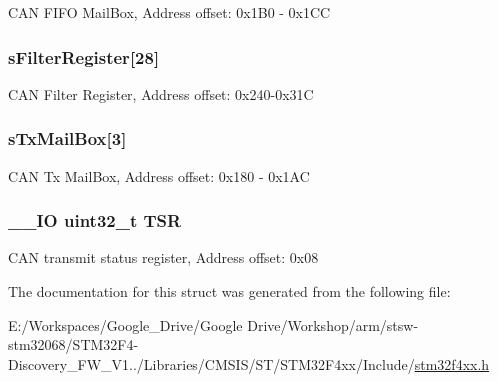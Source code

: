 C\-A\-N F\-I\-F\-O Mail\-Box, Address offset\-: 0x1\-B0 -\/ 0x1\-C\-C \hypertarget{struct_c_a_n___type_def_a31bd74513e6e599319702ad34113bf59}{
\subsubsection[{s\-Filter\-Register}]{ s\-Filter\-Register\mbox{[}28\mbox{]}}}\label{struct_c_a_n___type_def_a31bd74513e6e599319702ad34113bf59}
C\-A\-N Filter Register, Address offset\-: 0x240-\/0x31\-C \hypertarget{struct_c_a_n___type_def_ae37503ab1a7bbd29846f94cdadf0a9ef}{
\subsubsection[{s\-Tx\-Mail\-Box}]{ s\-Tx\-Mail\-Box\mbox{[}3\mbox{]}}}\label{struct_c_a_n___type_def_ae37503ab1a7bbd29846f94cdadf0a9ef}
C\-A\-N Tx Mail\-Box, Address offset\-: 0x180 -\/ 0x1\-A\-C \hypertarget{struct_c_a_n___type_def_a87e3001757a0cd493785f1f3337dd0e8}{
\subsubsection[{T\-S\-R}]{\setlength{\rightskip}{0pt plus 5cm}\-\_\-\-\_\-\-I\-O uint32\-\_\-t T\-S\-R}}\label{struct_c_a_n___type_def_a87e3001757a0cd493785f1f3337dd0e8}
C\-A\-N transmit status register, Address offset\-: 0x08 

The documentation for this struct was generated from the following file\-:\begin{DoxyCompactItemize}
\item 
E\-:/\-Workspaces/\-Google\-\_\-\-Drive/\-Google Drive/\-Workshop/arm/stsw-\/stm32068/\-S\-T\-M32\-F4-\/\-Discovery\-\_\-\-F\-W\-\_\-\-V1../\-Libraries/\-C\-M\-S\-I\-S/\-S\-T/\-S\-T\-M32\-F4xx/\-Include/\hyperlink{stm32f4xx_8h}{stm32f4xx.\-h}\end{DoxyCompactItemize}
